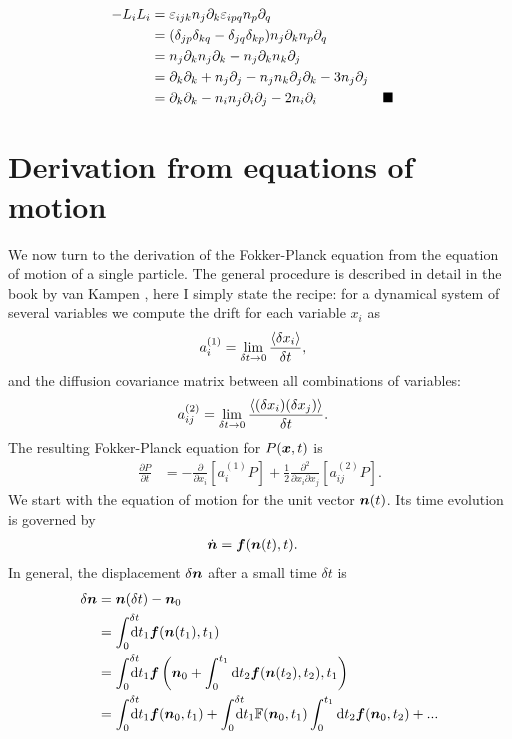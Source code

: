 \documentclass[thesis.tex]{subfiles}
\begin{document}
\begin{align*}
	-L_iL_i &= \varepsilon_{ijk}n_j\partial_k\varepsilon_{ipq}n_p\partial_q \\
	&= (\delta_{jp}\delta_{kq}-\delta_{jq}\delta_{kp})n_j\partial_kn_p\partial_q \\
	&= n_j\partial_kn_j\partial_k - n_j\partial_kn_k\partial_j \\
	&= \partial_k\partial_k + n_j \partial_j - n_j n_k \partial_j \partial_k - 3 n_j \partial_j\\
	&= \partial_k \partial_k - n_i n_j\partial_i\partial_j-2n_i\partial_i && \blacksquare
\end{align*}

\section{Derivation from equations of motion}
We now turn to the derivation of the Fokker-Planck equation from the equation of motion of a single particle. The general procedure is described in detail in the book by van Kampen \cite{kampen2007}, here I simply state the recipe: for a dynamical system of several variables we compute the drift for each variable $x_i$ as
\begin{align}
	a^{(1)}_i &= \lim_{\delta t\to0}\frac{\langle \delta x_i\rangle}{\delta t},\eqnlab{a1def}
\end{align}
and the diffusion covariance matrix between all combinations of variables:
\begin{align}
	a^{(2)}_{ij} &= \lim_{\delta t\to0}\frac{\langle (\delta x_i)(\delta x_j)\rangle}{\delta t}.\eqnlab{a2def}
\end{align}
The resulting Fokker-Planck equation for $P(\mbox{\boldmath$x$}, t)$ is
\begin{align*}
	\frac{\partial P}{\partial t} &= -\frac{\partial}{\partial x_i}\left[a^{(1)}_i P\right] + \frac{1}{2}\frac{\partial^2}{\partial x_i \partial x_j}\left[a^{(2)}_{ij} P\right].
\end{align*}
We start with the equation of motion for the unit vector $\mbox{\boldmath$n$}(t)$. Its time evolution is governed by 
\begin{align*}
	\dot {\mbox{\boldmath$n$}} &= \mbox{\boldmath$f$}(\mbox{\boldmath$n$}(t), t).
\end{align*}
In general, the displacement $\delta \mbox{\boldmath$n$}$ after a small time $\delta t$ is
\begin{align}
	\delta \ve n &= \ve n(\delta t) - \ve n_0 \nn\\
	&= \int_0^{\delta t}\!\!\!\!\!\rd t_1 \ve f (\ve n(t_1 ), t_1)\nn\\
	&= \int_0^{\delta t}\!\!\!\!\!\rd t_1 \ve f\left(\ve n_0 + \int_0^{t_1}\rd t_2 \ve f(\ve n(t_2),t_2), t_1\right)\nn\\
	&= \int_0^{\delta t}\!\!\!\!\!\rd t_1 \ve f (\ve n_0, t_1)+\int_0^{\delta t}\!\!\!\!\!\rd t_1 \ma F (\ve n_0, t_1)\int_0^{t_1}\rd t_2 \ve f(\ve n_0, t_2) + ...\eqnlab{deltan}
\end{align}
\end{document}
